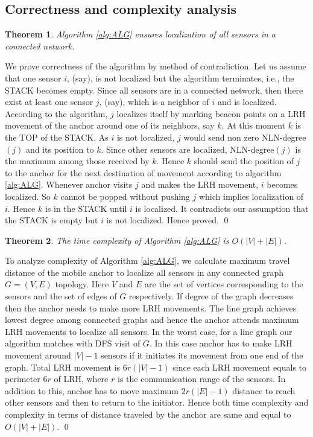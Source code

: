 \documentclass[preprint,11pt]{elsarticle}
\newtheorem{theorem}{Theorem}
\newenvironment{proof}{\noindent{\bf Proof: }}{\qed \smallbreak}
\begin{document}
\subsection{Correctness and complexity analysis}
\begin{theorem}
Algorithm \ref{alg:ALG} ensures localization of all sensors in a connected network.\label{th:correctness}
\end{theorem}
\begin{proof}
We prove correctness of the algorithm by  method of contradiction. Let us assume that one sensor $i$, (say), is not localized but the algorithm terminates, i.e., the STACK becomes empty. Since all sensors are in a connected network, then there exist at least one sensor $j$, (say), which is a neighbor of $i$ and is localized. According to the algorithm, $j$ localizes itself by marking beacon points on a LRH movement of the anchor around one of its neighbors, say $k$. At this moment $k$ is the TOP of the STACK. As $i$ is not localized, $j$ would send non zero NLN-degree$(j)$ and its position to $k$. Since other sensors are localized, NLN-degree$(j)$ is the maximum among those received by $k$. Hence $k$ should send the position of $j$ to the anchor for the next destination of movement according to algorithm \ref{alg:ALG}. Whenever anchor visits $j$ and makes the LRH movement, $i$ becomes localized. So $k$ cannot be popped without pushing $j$ which implies localization of $i$. Hence $k$ is in the STACK until $i$ is localized. It contradicts our assumption that the STACK is empty but $i$ is not localized. Hence proved.
\end{proof}
\begin{theorem}
The time complexity of Algorithm \ref{alg:ALG} is $O(|V|+|E|)$.\label{th:timecomplexity}
\end{theorem}
\begin{proof}
To analyze complexity of Algorithm \ref{alg:ALG}, we calculate maximum travel distance of the mobile anchor to localize all sensors in any connected graph $G=(V,E)$ topology. Here $V$ and $E$ are the set of vertices corresponding to the sensors and the set of edges of $G$ respectively. If degree of the graph decreases then the anchor needs to make more LRH movements. The line graph achieves lowest degree among connected graphs and hence the anchor attends maximum LRH movements to localize all sensors. In the worst case, for a line graph our algorithm matches with DFS visit of $G$. In this case anchor has to make LRH movement around $|V|-1$ sensors if it initiates its movement from one end of the graph. Total LRH movement is $6r(|V|-1)$ since each LRH movement equals to perimeter $6r$ of LRH, where $r$ is the communication range of the sensors. In addition to this, anchor has to move maximum $2r(|E|-1)$ distance to reach other sensors and then to return to the initiator.  Hence both time complexity and complexity in terms of distance traveled by the anchor are same and equal to $O(|V|+|E|)$.
\end{proof}
\end{document}
